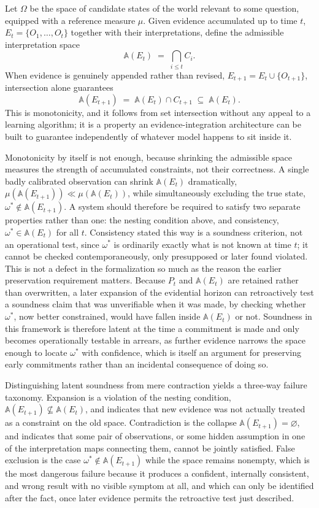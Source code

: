 \documentclass[11pt]{article}
\begin{document}
Let $\Omega$ be the space of candidate states of the world relevant to some question, equipped with a reference measure $\mu$. Given evidence accumulated up to time $t$, $E_t = \{O_1,\dots,O_t\}$ together with their interpretations, define the admissible interpretation space
\[
\mathbb{A}(E_t) \;=\; \bigcap_{i \le t} C_i .
\]
When evidence is genuinely appended rather than revised, $E_{t+1} = E_t \cup \{O_{t+1}\}$, intersection alone guarantees
\[
\mathbb{A}(E_{t+1}) \;=\; \mathbb{A}(E_t) \cap C_{t+1} \;\subseteq\; \mathbb{A}(E_t).
\]
This is monotonicity, and it follows from set intersection without any appeal to a learning algorithm; it is a property an evidence-integration architecture can be built to guarantee independently of whatever model happens to sit inside it.

Monotonicity by itself is not enough, because shrinking the admissible space measures the strength of accumulated constraints, not their correctness. A single badly calibrated observation can shrink $\mathbb{A}(E_t)$ dramatically, $\mu(\mathbb{A}(E_{t+1})) \ll \mu(\mathbb{A}(E_t))$, while simultaneously excluding the true state, $\omega^\ast \notin \mathbb{A}(E_{t+1})$. A system should therefore be required to satisfy two separate properties rather than one: the nesting condition above, and consistency, $\omega^\ast \in \mathbb{A}(E_t)$ for all $t$. Consistency stated this way is a soundness criterion, not an operational test, since $\omega^\ast$ is ordinarily exactly what is not known at time $t$; it cannot be checked contemporaneously, only presupposed or later found violated. This is not a defect in the formalization so much as the reason the earlier preservation requirement matters. Because $P_t$ and $\mathbb{A}(E_t)$ are retained rather than overwritten, a later expansion of the evidential horizon can retroactively test a soundness claim that was unverifiable when it was made, by checking whether $\omega^\ast$, now better constrained, would have fallen inside $\mathbb{A}(E_t)$ or not. Soundness in this framework is therefore latent at the time a commitment is made and only becomes operationally testable in arrears, as further evidence narrows the space enough to locate $\omega^\ast$ with confidence, which is itself an argument for preserving early commitments rather than an incidental consequence of doing so.

Distinguishing latent soundness from mere contraction yields a three-way failure taxonomy. Expansion is a violation of the nesting condition, $\mathbb{A}(E_{t+1}) \not\subseteq \mathbb{A}(E_t)$, and indicates that new evidence was not actually treated as a constraint on the old space. Contradiction is the collapse $\mathbb{A}(E_{t+1}) = \varnothing$, and indicates that some pair of observations, or some hidden assumption in one of the interpretation maps connecting them, cannot be jointly satisfied. False exclusion is the case $\omega^\ast \notin \mathbb{A}(E_{t+1})$ while the space remains nonempty, which is the most dangerous failure because it produces a confident, internally consistent, and wrong result with no visible symptom at all, and which can only be identified after the fact, once later evidence permits the retroactive test just described.
\end{document}
